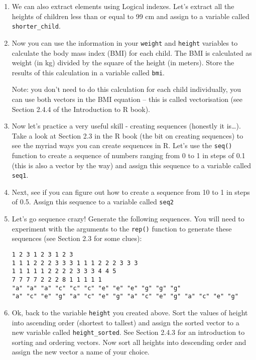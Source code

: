 \documentclass[12pt]{article}
\newcommand{\lst}[1]{\lstinline{#1}}
\begin{document}
\begin{enumerate}
\item We can also extract elements using Logical indexes. Let’s extract all the heights of children less than or equal to 99 cm and assign to a variable called \lst{shorter_child}.

 

\item Now you can use the information in your \lst{weight} and \lst{height} variables to calculate the body mass index (BMI) for each child. The BMI is calculated as weight (in kg) divided by the square of the height (in meters). Store the results of this calculation in a variable called \lst{bmi}. 

Note: you don’t need to do this calculation for each child individually, you can use both vectors in the BMI equation – this is called vectorisation (see Section 2.4.4 of the Introduction to R book).

 

\item Now let’s practice a very useful skill - creating sequences (honestly it is…). Take a look at Section 2.3 in the R book (the bit on creating sequences) to see the myriad ways you can create sequences in R. Let’s use the 
\lst{seq()} function to create a sequence of numbers ranging from 0 to 1 in steps of 0.1 (this is also a vector by the way) and assign this sequence to a variable called \lst{seq1}.

 

\item Next, see if you can figure out how to create a sequence from 10 to 1 in steps of 0.5. Assign this sequence to a variable called \lst{seq2}
 

\item Let’s go sequence crazy! Generate the following sequences. You will need to experiment with the arguments to the \lst{rep()} function to generate these sequences (see Section 2.3 for some clues):
\begin{verbatim}
1 2 3 1 2 3 1 2 3
1 1 1 2 2 2 3 3 3 1 1 1 2 2 2 3 3 3
1 1 1 1 1 2 2 2 2 3 3 3 4 4 5
7 7 7 7 2 2 2 8 1 1 1 1 1
"a" "a" "a" "c" "c" "c" "e" "e" "e" "g" "g" "g"
"a" "c" "e" "g" "a" "c" "e" "g" "a" "c" "e" "g" "a" "c" "e" "g"

\end{verbatim}
 

\item Ok, back to the variable \lst{height} you created above. Sort the values of height into ascending order (shortest to tallest) and assign the sorted vector to a new variable called \lst{height_sorted}. See Section 2.4.3 for an introduction to sorting and ordering vectors. Now sort all heights into descending order and assign the new vector a name of your choice.


\end{enumerate}
\end{document}

